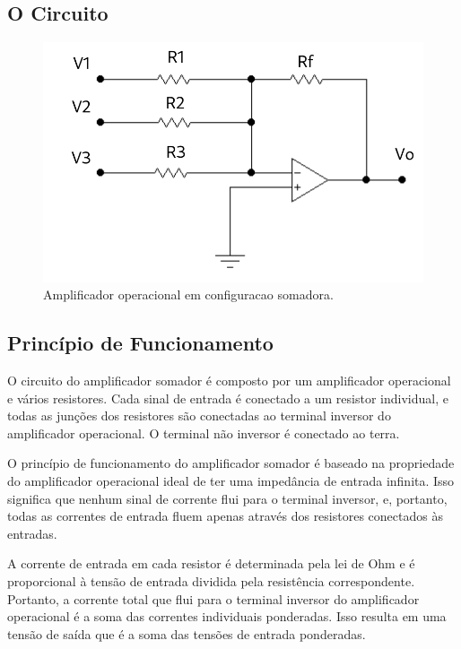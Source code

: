 \documentclass[12pt,twoside, a4paper, twocolumn]{article}
\begin{document}
\subsection{O Circuito}

\begin{figure}[h]
    \centering
    \includegraphics[width=1\columnwidth]{images/opamp_somador.png}
    \caption{Amplificador operacional em configuracao somadora.}
\end{figure}

\subsection{Princípio de Funcionamento}

O circuito do amplificador somador é composto por um amplificador operacional e vários resistores. Cada sinal de entrada é conectado a um resistor individual, e todas as junções dos resistores são conectadas ao terminal inversor do amplificador operacional. O terminal não inversor é conectado ao terra.

O princípio de funcionamento do amplificador somador é baseado na propriedade do amplificador operacional ideal de ter uma impedância de entrada infinita. Isso significa que nenhum sinal de corrente flui para o terminal inversor, e, portanto, todas as correntes de entrada fluem apenas através dos resistores conectados às entradas.

A corrente de entrada em cada resistor é determinada pela lei de Ohm e é proporcional à tensão de entrada dividida pela resistência correspondente. Portanto, a corrente total que flui para o terminal inversor do amplificador operacional é a soma das correntes individuais ponderadas. Isso resulta em uma tensão de saída que é a soma das tensões de entrada ponderadas.
\end{document}
